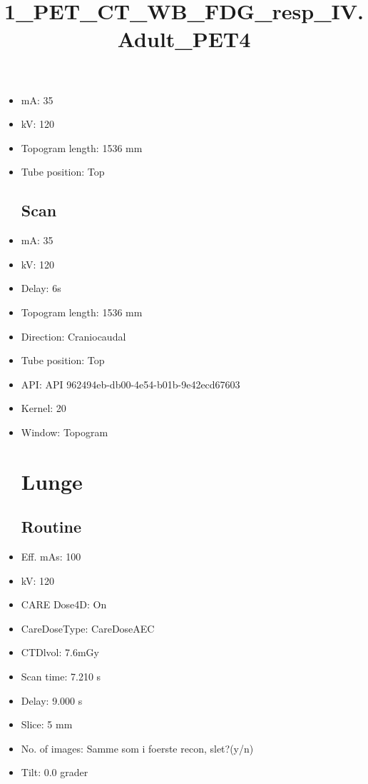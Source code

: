 \documentclass[12pt]{article}
\title{1\_PET\_CT\_WB\_FDG\_resp\_IV.Adult\_PET4}
\begin{document}
\maketitle
\newpage
\tableofcontents
\newpage
{}


\begin{itemize}\section{Topogram}
\subsection{Routine}
\item mA: 35\item kV: 120\item Topogram length: 1536 mm\item Tube position: Top
\subsection{Scan}\item mA: 35\item kV: 120\item Delay: 6s\item Topogram length: 1536 mm\item Direction: Craniocaudal\item Tube position: Top\item API: API 962494eb-db00-4e54-b01b-9e42ecd67603\item Kernel: 20\item Window: Topogram
\section{Lunge}
\subsection{Routine}
\item Eff. mAs: 100\item kV: 120\item CARE Dose4D: On\item CareDoseType: CareDoseAEC\item CTDlvol: 7.6mGy\item Scan time: 7.210 s\item Delay: 9.000 s\item Slice: 5 mm\item No. of images: Samme som i foerste recon, slet?(y/n)\item Tilt: 0.0 grader

\end{itemize}
\end{document}
